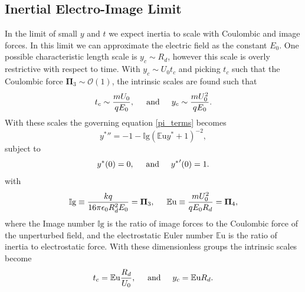 \documentclass[12pt,a4paper,oneside]{book}
\begin{document}
\subsection{Inertial Electro-Image Limit}
In the limit of small $y$ and $t$ we expect inertia to scale with Coulombic and image forces. In this limit we can approximate the electric field as the constant $E_0$. One possible characteristic length scale is $y_c \sim R_d$, however this scale is overly restrictive with respect to time. With $y_c \sim U_0 t_c$ and picking $t_c$ such that the Coulombic force $\mathbf{\Pi}_3 \sim \mathcal{O}(1)$, the intrinsic scales are found such that
\[ t_c \sim \frac{m U_0}{q E_0}, \hspace{5 mm} \mbox{and} \hspace{5 mm} 
y_c \sim \frac{m U_0^2}{q E_0} .
\]
With these scales the governing equation \ref{pi_terms} becomes
\begin{equation}
{y^*}'' = -1 - \mathbb{I}\mbox{g} \left( \mathbb{E}\mbox{u}{y^*} + 1 \right)^{-2} , \label{img_limit}
\end{equation}
subject to
\begin{equation*}
{y^*}(0) = 0, \hspace{5 mm} \mbox{and} \hspace{5 mm} {y^*}'(0) = 1 .
\end{equation*}
with 
\[ \mathbb{I}\mbox{g} \equiv \frac{k q}{16 \pi \epsilon_0 R_d^2 E_0} = \mathbf{\Pi}_3, \hspace{5 mm}
\mathbb{E}\mbox{u} \equiv \frac{m U_0^2}{q E_0 R_d} = \mathbf{\Pi}_4 ,
\]
where the Image number $\mathbb{I}\mbox{g}$ is the ratio of image forces to the Coulombic force of the unperturbed field, and the electrostatic Euler number $\mathbb{E}\mbox{u}$ is the ratio of inertia to electrostatic force. With these dimensionless groups the intrinsic scales become
\[ t_c = \mathbb{E}\mbox{u} \frac{R_d}{U_0}, \hspace{5 mm} \mbox{and} \hspace{5 mm}
y_c = \mathbb{E}\mbox{u} R_d.
\]
\end{document}
